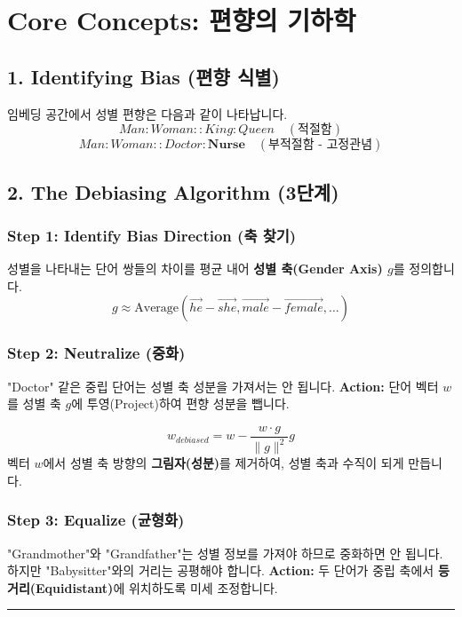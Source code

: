 \documentclass[11pt,a4paper]{book}
\theoremstyle{definition}
\begin{document}
\section{Core Concepts: 편향의 기하학}

\subsection{1. Identifying Bias (편향 식별)}
임베딩 공간에서 성별 편향은 다음과 같이 나타납니다.
$$ Man : Woman :: King : Queen \quad (\text{적절함}) $$
$$ Man : Woman :: Doctor : \textbf{Nurse} \quad (\text{부적절함 - 고정관념}) $$

\subsection{2. The Debiasing Algorithm (3단계)}


\subsubsection{Step 1: Identify Bias Direction (축 찾기)}
성별을 나타내는 단어 쌍들의 차이를 평균 내어 \textbf{성별 축(Gender Axis) $g$}를 정의합니다.
$$ g \approx \text{Average}(\vec{he}-\vec{she}, \vec{male}-\vec{female}, \dots) $$

\subsubsection{Step 2: Neutralize (중화)}
"Doctor" 같은 중립 단어는 성별 축 성분을 가져서는 안 됩니다.
\textbf{Action:} 단어 벡터 $w$를 성별 축 $g$에 투영(Project)하여 편향 성분을 뺍니다.

\begin{formulabox}[title={중화 공식 (Projection)}]
$$ w_{debiased} = w - \frac{w \cdot g}{\|g\|^2} g $$
벡터 $w$에서 성별 축 방향의 \textbf{그림자(성분)}를 제거하여, 성별 축과 수직이 되게 만듭니다.
\end{formulabox}

\subsubsection{Step 3: Equalize (균형화)}
"Grandmother"와 "Grandfather"는 성별 정보를 가져야 하므로 중화하면 안 됩니다. 하지만 "Babysitter"와의 거리는 공평해야 합니다.
\textbf{Action:} 두 단어가 중립 축에서 \textbf{등거리(Equidistant)}에 위치하도록 미세 조정합니다.

\vspace{0.5cm}\hrule\vspace{0.5cm}
\end{document}
